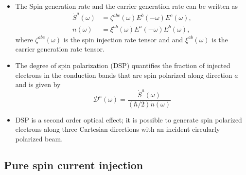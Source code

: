 \documentclass{beamer}
\begin{document}
\begin{frame}


{\small

\begin{itemize}

\item 
The Spin generation rate and the carrier generation rate can be written as
\vspace{-4mm}
\begin{align*}
    \dot{S}^{a}(\omega)&= 
\zeta^{abc}(\omega)E^{b}(-\omega)E^{c}(\omega), \\
\dot{n}(\omega)&= 
\xi^{ab}(\omega)E^{a}(-\omega)E^{b}(\omega),
\end{align*}
where $\zeta^{abc}(\omega)$ is the spin injection rate tensor and and $\xi^
{ab}(\omega)$ is the carrier generation rate tensor.

\item 
The degree of spin polarization (DSP) quantifies the fraction of injected
electrons
in the conduction bands that are spin polarized along direction $a$ and is
given by
\vspace{-2mm}
\begin{equation}
\mathcal{D}^{a}(\omega)=
\frac{\dot{S}^{a}(\omega)}{(\hbar/2)\dot{n}(\omega)}
\end{equation}

\item 
DSP is a second order optical effect; it is possible to generate spin
polarized
electrons along three Cartesian directions with an incident circularly polarized
beam.


\end{itemize}
}


\end{frame}




\subsection{Pure spin current injection}
\end{document}
